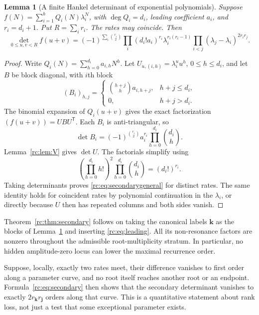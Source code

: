 \documentclass[11pt,a4paper]{article}
\numberwithin{equation}{section}
\newtheorem{lemma}[theorem]{Lemma}
\theoremstyle{definition}
\theoremstyle{remark}
\newcommand{\bk}{\boldsymbol{k}}
\newcommand{\bj}{\boldsymbol{j}}
\begin{document}
\begin{lemma}[A finite Hankel determinant of exponential polynomials]
\label{rc:lem:secondarygeneral}
Suppose
$f(N)=\sum_{i=1}^{b}Q_i(N)\lambda_i^N$, with
$\deg Q_i=d_i$, leading coefficient $a_i$, and $r_i=d_i+1$.
Put $R=\sum_i r_i$.  The rates may coincide.  Then
\begin{equation}\label{rc:eq:secondarygeneral}
 \det_{0\le u,v<R}f(u+v)
 =(-1)^{\sum_i\binom{r_i}2}
  \prod_i (d_i!a_i)^{r_i}\lambda_i^{r_i(r_i-1)}
  \prod_{i<j}(\lambda_j-\lambda_i)^{2r_i r_j}.
\end{equation}
\end{lemma}
\begin{proof}
Write $Q_i(N)=\sum_{h=0}^{d_i}a_{i,h}N^h$.
Let $U_{u,(i,h)}=\lambda_i^u u^h$, $0\le h\le d_i$, and let $B$ be
block diagonal, with $i$th block
\[
 (B_i)_{h,j}=\begin{cases}
     \binom{h+j}{h}a_{i,h+j},&h+j\le d_i,\\
     0,&h+j>d_i.
 \end{cases}
\]
The binomial expansion of $Q_i(u+v)$ gives the exact factorization
$(f(u+v))=UBU^{\mathsf T}$.  Each $B_i$ is anti-triangular, so
\[
 \det B_i=(-1)^{\binom{r_i}2}
                  a_i^{r_i}\prod_{h=0}^{d_i}\binom{d_i}{h}.
\]
Lemma~\ref{rc:lem:V} gives $\det U$.  The factorials simplify using
\[
 \left(\prod_{h=0}^{d_i}h!\right)^2
       \prod_{h=0}^{d_i}\binom{d_i}{h}=(d_i!)^{r_i}.
\]
Taking determinants proves \eqref{rc:eq:secondarygeneral} for distinct
rates.  The same identity holds for coincident rates by polynomial
continuation in the $\lambda_i$, or directly because $U$ then has
repeated columns and both sides vanish.
\end{proof}

Theorem~\ref{rc:thm:secondary} follows on taking the canonical labels
$\bk$ as the blocks of Lemma~\ref{rc:lem:secondarygeneral} and inserting
\eqref{rc:eq:leading}.  All its non-resonance factors are nonzero throughout
the admissible root-multiplicity stratum.  In particular, no hidden
amplitude-zero locus can lower the maximal recurrence order.

Suppose, locally, exactly two rates meet, their difference vanishes to
first order along a parameter curve, and no root itself reaches another
root or an endpoint.  Formula~\eqref{rc:eq:secondary} then shows that the
secondary determinant vanishes to exactly $2r_{\bk}r_{\bj}$ orders
along that curve.  This is a quantitative statement about rank loss,
not just a test that some exceptional parameter exists.
\end{document}
